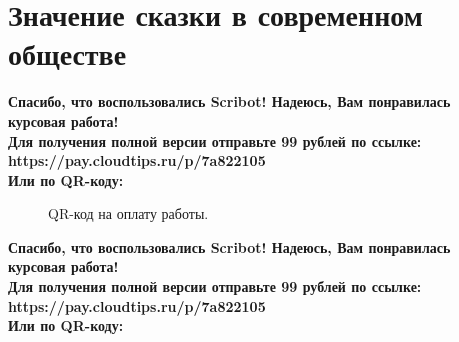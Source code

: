 \documentclass{article}
\begin{document}
\section{Значение сказки в современном обществе}
\begin{center}
    \textbf{
        Спасибо, что воспользовались Scribot! Надеюсь, Вам понравилась курсовая работа!\\
        Для получения полной версии отправьте 99 рублей по ссылке:\\
        https://pay.cloudtips.ru/p/7a822105\\
        Или по QR-коду:\\
    }
\end{center}
\begin{figure}[h]
    \caption{QR-код на оплату работы.}
    \label{ris:image}
\end{figure}
\newpage
\begin{center}
    \textbf{
        Спасибо, что воспользовались Scribot! Надеюсь, Вам понравилась курсовая работа!\\
        Для получения полной версии отправьте 99 рублей по ссылке:\\
        https://pay.cloudtips.ru/p/7a822105\\
        Или по QR-коду:\\
    }
\end{center}
\end{document}
